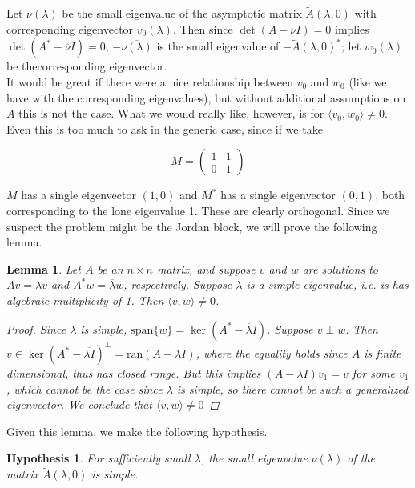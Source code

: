 \documentclass[12pt]{article}
\newtheorem{lemma}{Lemma}
\newtheorem{hypothesis}{Hypothesis}
\begin{document}
Let $\nu(\lambda)$ be the small eigenvalue of the asymptotic matrix $\tilde{A}(\lambda,0)$ with corresponding eigenvector $v_0(\lambda)$. Then since $\det(A - \nu I) = 0$ implies $\det(A^* - \overline{\nu}I) = 0$, $-\overline{\nu(\lambda)}$ is the small eigenvalue of $-\tilde{A}(\lambda,0)^*$; let $w_0(\lambda)$ be thecorresponding eigenvector.\\

It would be great if there were a nice relationship between $v_0$ and $w_0$ (like we have with the corresponding eigenvalues), but without additional assumptions on $A$ this is not the case. What we would really like, however, is for $\langle v_0, w_0 \rangle \neq 0$. Even this is too much to ask in the generic case, since if we take

\[
M = \begin{pmatrix}1 & 1 \\ 0 & 1 \end{pmatrix}
\]

$M$ has a single eigenvector $(1, 0)$ and $M^*$ has a single eigenvector $(0, 1)$, both corresponding to the lone eigenvalue 1. These are clearly orthogonal. Since we suspect the problem might be the Jordan block, we will prove the following lemma.

\begin{lemma}\label{perpeigs}
Let $A$ be an $n \times n$ matrix, and suppose $v$ and $w$ are solutions to $Av = \lambda v$ and $A^*w = \overline{\lambda}w$, respectively. Suppose $\lambda$ is a simple eigenvalue, i.e. is has algebraic multiplicity of 1. Then $\langle v, w \rangle \neq 0$.
\begin{proof}
Since $\lambda$ is simple, $\text{span} \{w\} = \ker(A^* - \overline{\lambda}I)$. Suppose $v \perp w$. Then $v \in \ker(A^* - \overline{\lambda I})^\perp = \text{ran}(A - \lambda I)$, where the equality holds since $A$ is finite dimensional, thus has closed range. But this implies $(A - \lambda I)v_1 = v$ for some $v_1$, which cannot be the case since $\lambda$ is simple, so there cannot be such a generalized eigenvector. We conclude that $\langle v, w \rangle \neq 0$
\end{proof}
\end{lemma}

Given this lemma, we make the following hypothesis.

\begin{hypothesis}\label{simplesmalleig}
For sufficiently small $\lambda$, the small eigenvalue $\nu(\lambda)$ of the matrix $\tilde{A}(\lambda, 0)$ is simple.
\end{hypothesis}
\end{document}
